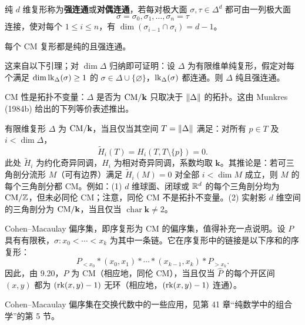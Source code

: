 纯 $d$ 维复形称为\textbf{强连通}或\textbf{对偶连通}，若每对极大面 $\sigma,\tau\in\Delta^d$ 都可由一列极大面
\[
\sigma=\sigma_0,\sigma_1,\ldots,\sigma_n=\tau
\]
连接，使对每个 $1\le i\le n$，有 $\dim(\sigma_{i-1}\cap\sigma_i)=d-1$。

每个 CM 复形都是纯的且强连通。

这来自以下引理；对 $\dim\Delta$ 归纳即可证明：设 $\Delta$ 为有限维单纯复形，假定对每个满足 $\dim\operatorname{lk}_\Delta(\sigma)\ge1$ 的 $\sigma\in\Delta\cup\{\varnothing\}$，$\operatorname{lk}_\Delta(\sigma)$ 都连通。则 $\Delta$ 纯且强连通。

CM 性是拓扑不变量：$\Delta$ 是否为 $\mathrm{CM}/\mathbf k$ 只取决于 $\lVert\Delta\rVert$ 的拓扑。这由 Munkres (1984b) 给出的下列等价表述推出。

有限维复形 $\Delta$ 为 $\mathrm{CM}/\mathbf k$，当且仅当其空间 $T=\lVert\Delta\rVert$ 满足：对所有 $p\in T$ 及 $i<\dim\Delta$，
\[
\widetilde H_i(T)=H_i(T,T\setminus\{p\})=0.
\]
此处 $\widetilde H_i$ 为约化奇异同调，$H_i$ 为相对奇异同调，系数均取 $\mathbf k$。其推论是：若可三角剖分流形 $M$（可有边界）满足 $\widetilde H_i(M)=0$ 对全部 $i<\dim M$ 成立，则 $M$ 的每个三角剖分都 CM。例如：(1) $d$ 维球面、闭球或 $\mathbb R^d$ 的每个三角剖分均为 $\mathrm{CM}/\mathbb Z$，但未必同伦 CM；注意，同伦 CM 不是拓扑不变量。(2) 实射影 $d$ 维空间的三角剖分为 $\mathrm{CM}/\mathbf k$，当且仅当 $\operatorname{char}\mathbf k\ne2$。

Cohen--Macaulay 偏序集，即序复形为 CM 的偏序集，值得补充一点说明。设 $P$ 具有有限秩，$\sigma:x_0<\cdots<x_k$ 为其中一条链。它在序复形中的链接是以下序和的序复形：
\[
P_{<x_0}*(x_0,x_1)*\cdots*(x_{k-1},x_k)*P_{>x_k}.
\]
因此，由 9.20，$P$ 为 CM（相应地，同伦 CM），当且仅当 $\widehat P$ 的每个开区间 $(x,y)$ 都为 $(\operatorname{rk}(x,y)-1)$ 无环（相应地，$(\operatorname{rk}(x,y)-1)$ 连通）。

Cohen--Macaulay 偏序集在交换代数中的一些应用，见第 41 章“纯数学中的组合学”的第 5 节。

